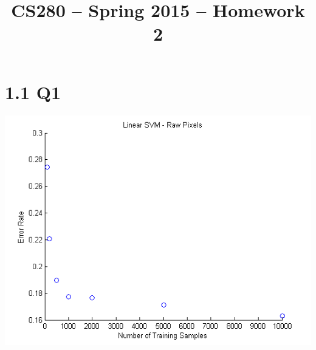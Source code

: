 \documentclass[11pt]{article}
\title{CS280 -- Spring 2015 -- Homework 2}
\author{\Name}
\begin{document}
\maketitle

\section*{1.1 Q1}
\includegraphics[scale=0.9]{diagrams/Question11.png}
\newpage
\end{document}
